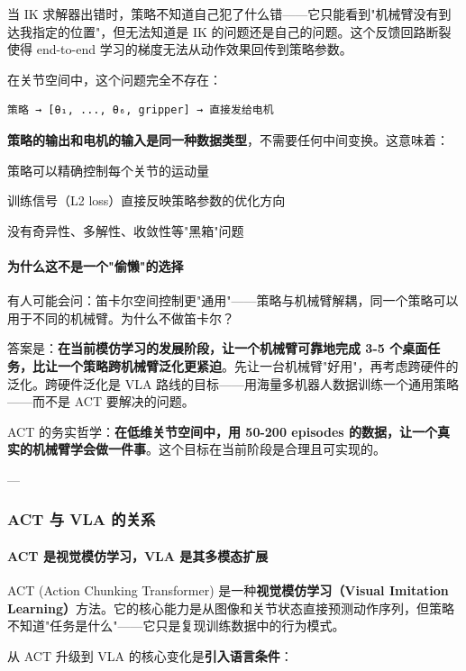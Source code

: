 \documentclass[UTF8,a4paper,11pt]{ctexart}
\begin{document}
{当 IK 求解器出错时，策略不知道自己犯了什么错——它只能看到"机械臂没有到达我指定的位置"，但无法知道是 IK 的问题还是自己的问题。这个反馈回路断裂使得 end-to-end 学习的梯度无法从动作效果回传到策略参数。

在关节空间中，这个问题完全不存在：

\begin{lstlisting}[language=text]
策略 → [θ₁, ..., θ₆, gripper] → 直接发给电机
\end{lstlisting}

\textbf{策略的输出和电机的输入是同一种数据类型}，不需要任何中间变换。这意味着：
\item 策略可以精确控制每个关节的运动量
\item 训练信号（L2 loss）直接反映策略参数的优化方向
\item 没有奇异性、多解性、收敛性等"黑箱"问题

\paragraph{为什么这不是一个"偷懒"的选择}


有人可能会问：笛卡尔空间控制更"通用"——策略与机械臂解耦，同一个策略可以用于不同的机械臂。为什么不做笛卡尔？

答案是：\textbf{在当前模仿学习的发展阶段，让一个机械臂可靠地完成 3-5 个桌面任务，比让一个策略跨机械臂泛化更紧迫}。先让一台机械臂"好用"，再考虑跨硬件的泛化。跨硬件泛化是 VLA 路线的目标——用海量多机器人数据训练一个通用策略——而不是 ACT 要解决的问题。

ACT 的务实哲学：\textbf{在低维关节空间中，用 50-200 episodes 的数据，让一个真实的机械臂学会做一件事}。这个目标在当前阶段是合理且可实现的。

---

\subsubsection{ACT 与 VLA 的关系}

\paragraph{ACT 是视觉模仿学习，VLA 是其多模态扩展}


ACT (Action Chunking Transformer) 是一种\textbf{视觉模仿学习（Visual Imitation Learning）}方法。它的核心能力是从图像和关节状态直接预测动作序列，但策略不知道"任务是什么"——它只是复现训练数据中的行为模式。

从 ACT 升级到 VLA 的核心变化是\textbf{引入语言条件}：

}
\end{document}
